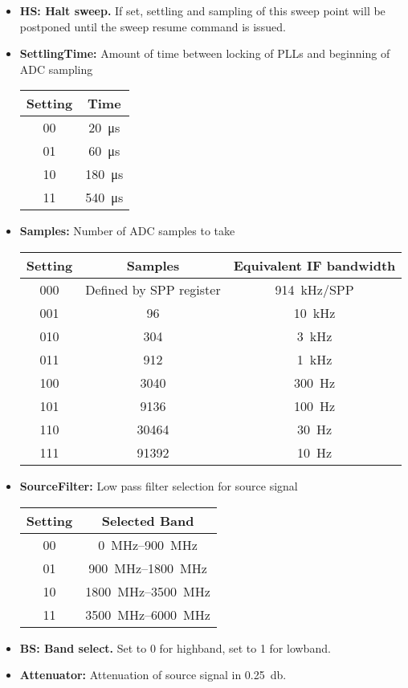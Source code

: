 \documentclass{article}
\begin{document}
\begin{itemize}
\item \textbf{HS: Halt sweep.} If set, settling and sampling of this sweep point will be postponed until the sweep resume command is issued.
\item \textbf{SettlingTime:} Amount of time between locking of PLLs and beginning of ADC sampling
\begin{center}
\begin{tabular}{ c|c }
Setting & Time\\
 \hline
00 & \SI{20}{\micro\second}\\
01 & \SI{60}{\micro\second}\\
10 & \SI{180}{\micro\second}\\
11 & \SI{540}{\micro\second}\\
\end{tabular}
\end{center}
\item \textbf{Samples:} Number of ADC samples to take
\begin{center}
\begin{tabular}{ c|c|c }
Setting & Samples & Equivalent IF bandwidth\\
 \hline
000 & Defined by SPP register & \SI{914}{\kilo\hertz}/SPP\\
001 & 96 & \SI{10}{\kilo\hertz}\\
010 & 304 & \SI{3}{\kilo\hertz}\\
011 & 912 & \SI{1}{\kilo\hertz}\\
100 & 3040 & \SI{300}{\hertz}\\
101 & 9136 & \SI{100}{\hertz}\\
110 & 30464 & \SI{30}{\hertz}\\
111 & 91392 & \SI{10}{\hertz}\\
\end{tabular}
\end{center}
\item \textbf{SourceFilter:} Low pass filter selection for source signal
\begin{center}
\begin{tabular}{ c|c }
Setting & Selected Band\\
 \hline
00 & \SIrange{0}{900}{\mega\hertz}\\
01 & \SIrange{900}{1800}{\mega\hertz}\\
10 & \SIrange{1800}{3500}{\mega\hertz}\\
11 & \SIrange{3500}{6000}{\mega\hertz}\\
\end{tabular}
\end{center}
\item \textbf{BS: Band select.} Set to 0 for highband, set to 1 for lowband.
\item \textbf{Attenuator:} Attenuation of source signal in \SI{0.25}{\decibel}.
\end{itemize}
\end{document}
